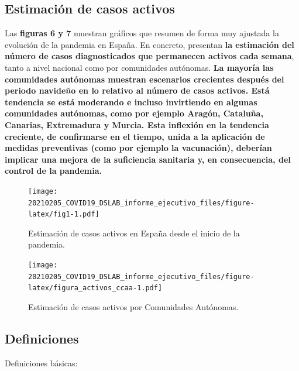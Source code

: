 \documentclass[
  11pt,
]{article}
\begin{document}
\clearpage

\setcounter{page}{9}

\hypertarget{estimaciuxf3n-de-casos-activos}{%
\subsection{Estimación de casos
activos}\label{estimaciuxf3n-de-casos-activos}}

Las \textbf{figuras 6 y 7} muestran gráficos que resumen de forma muy
ajustada la evolución de la pandemia en España. En concreto, presentan
\textbf{la estimación del número de casos diagnosticados que permanecen
activos cada semana}, tanto a nivel nacional como por comunidades
autónomas. \textbf{La mayoría las comunidades autónomas muestran
escenarios crecientes después del periodo navideño en lo relativo al
número de casos activos. Está tendencia se está moderando e incluso
invirtiendo en algunas comunidades autónomas, como por ejemplo Aragón,
Cataluña, Canarias, Extremadura y Murcia. Esta inflexión en la tendencia
creciente, de confirmarse en el tiempo, unida a la aplicación de medidas
preventivas (como por ejemplo la vacunación), deberían implicar una
mejora de la suficiencia sanitaria y, en consecuencia, del control de la
pandemia.}

\vspace{0.2cm}

\begin{figure}
\centering
\texttt{[image: 20210205\_COVID19\_DSLAB\_informe\_ejecutivo\_files/figure-latex/fig1-1.pdf]}
\caption{\label{fig:fig17a_res} Estimación de casos activos en España
desde el inicio de la pandemia.}
\end{figure}

\begin{figure}
\centering
\texttt{[image: 20210205\_COVID19\_DSLAB\_informe\_ejecutivo\_files/figure-latex/figura\_activos\_ccaa-1.pdf]}
\caption{\label{fig:figura_activos_ccaa} Estimación de casos activos por
Comunidades Autónomas.}
\end{figure}

\newpage
\setcounter{page}{11}

\hypertarget{definiciones}{%
\subsection{Definiciones}\label{definiciones}}

Definiciones básicas:
\end{document}
